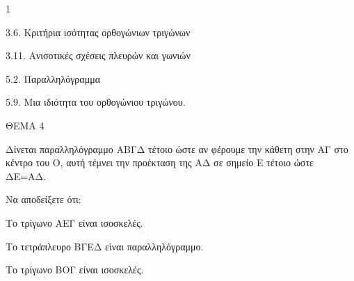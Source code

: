 \begin{ylh}{1}
    \item 3.6. Κριτήρια ισότητας ορθογώνιων τριγώνων
    \item 3.11. Ανισοτικές σχέσεις πλευρών και γωνιών
    \item 5.2. Παραλληλόγραμμα
    \item 5.9. Μια ιδιότητα του ορθογώνιου τριγώνου.
\end{ylh}

ΘΕΜΑ 4

Δίνεται παραλληλόγραμμο ΑΒΓΔ τέτοιο ώστε αν φέρουμε την κάθετη στην ΑΓ στο κέντρο του Ο, αυτή τέμνει την προέκταση της ΑΔ σε σημείο Ε τέτοιο ώστε ΔΕ=ΑΔ.

Να αποδείξετε ότι:

\begin{alist}
\item Το τρίγωνο ΑΕΓ είναι ισοσκελές. 

\item Το τετράπλευρο ΒΓΕΔ είναι παραλληλόγραμμο. 

\item Το τρίγωνο ΒΟΓ είναι ισοσκελές. 


\end{alist}
